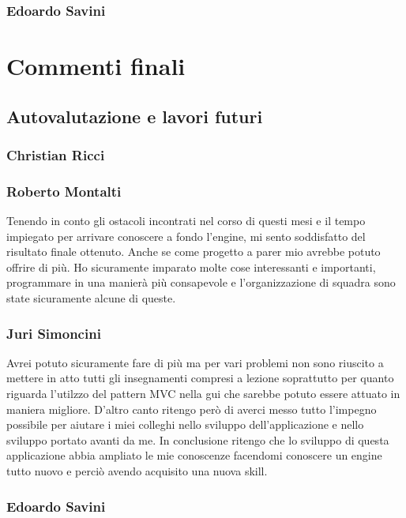 \subsection{Edoardo Savini}

\chapter{Commenti finali}

\section{Autovalutazione e lavori futuri}
\subsection{Christian Ricci}

\subsection{Roberto Montalti}
Tenendo in conto gli ostacoli incontrati nel corso di questi mesi e il tempo impiegato per arrivare conoscere a fondo l'engine, mi sento soddisfatto del risultato finale ottenuto.
Anche se come progetto a parer mio avrebbe potuto offrire di più.
Ho sicuramente imparato molte cose interessanti e importanti, programmare in una manierà più consapevole e l'organizzazione di squadra sono state sicuramente alcune di queste.

\subsection{Juri Simoncini}
Avrei potuto sicuramente fare di più ma per vari problemi non sono riuscito a mettere in atto tutti gli insegnamenti compresi a lezione soprattutto per quanto riguarda l'utilzzo del pattern MVC nella gui che sarebbe potuto essere attuato in maniera migliore.
D'altro canto ritengo però di averci messo tutto l'impegno possibile per aiutare i miei colleghi nello sviluppo dell'applicazione e nello sviluppo portato avanti da me.
In conclusione ritengo che lo sviluppo di questa applicazione abbia ampliato le mie conoscenze facendomi conoscere un engine tutto nuovo e perciò avendo acquisito una nuova skill. 

\subsection{Edoardo Savini}



